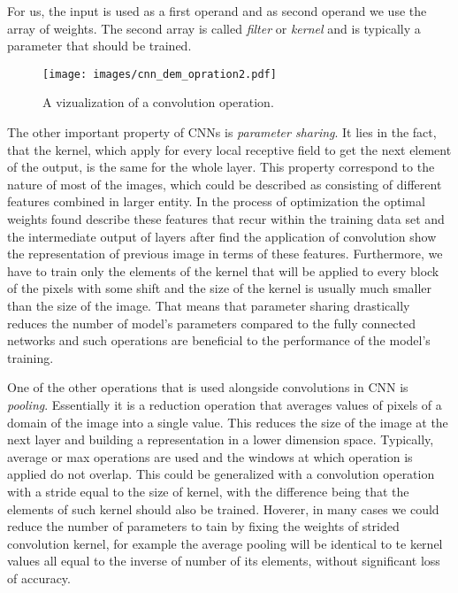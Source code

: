 For us, the input is used as a first operand and as second operand we use the array of weights.
The second array is called \textit{filter} or \textit{kernel} and is typically a parameter that should be trained. 
\medskip
\begin{figure}
	\centering
	\texttt{[image: images/cnn\_dem\_opration2.pdf]}
	\caption{A vizualization of a convolution operation.}
	\label{fig:convoper_demo}
\end{figure}
\medskip

The other important property of CNNs is \textit{parameter sharing}. 
It lies in the fact, that the kernel, which apply for every local receptive field to get the next element of the output, is the same for the whole layer. 
This property correspond to the nature of most of the images, which could be described as consisting of different features combined in larger entity.
In the process of optimization the optimal weights found describe these features that recur within the training data set and the intermediate output of layers after find the application of convolution show the representation of previous image in terms of these features.
Furthermore, we have to train only the elements of the kernel that will be applied to every block of the pixels with some shift and the size of the kernel is usually much smaller than the size of the image.
That means that parameter sharing drastically reduces the number of model's parameters compared to the fully connected networks and such operations are beneficial to the performance of the model's training.
\medskip

One of the other operations that is used alongside convolutions in CNN is \textit{pooling}.
Essentially it is a reduction operation that averages values of pixels of a domain of the image into a single value.
This reduces the size of the image at the next layer and building a representation in a lower dimension space. 
Typically, average or max operations are used and the windows at which operation is applied do not overlap.
This could be generalized with a convolution operation with a stride equal to the size of kernel, with the difference being that the elements of such kernel should also be trained.
Hoverer, in many cases we could reduce the number of parameters to tain by fixing the weights of strided convolution kernel, for example the average pooling will be identical to te kernel values all equal to the inverse of number of its elements, without significant loss of accuracy\cite{}.
\medskip

